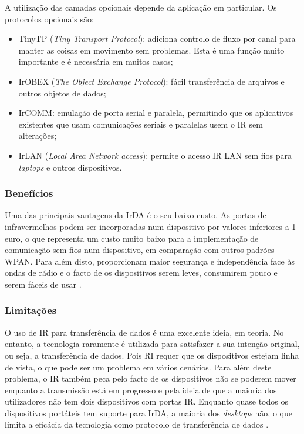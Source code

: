 \documentclass[conference]{IEEEtran}
\begin{document}
A utilização das camadas opcionais depende da aplicação em particular. Os protocolos opcionais são:

\begin{itemize}

 \item TinyTP (\textit{Tiny Transport Protocol}): adiciona controlo de fluxo por canal para manter as coisas em movimento sem problemas. Esta é uma função muito importante e é necessária em muitos casos;
 \item IrOBEX (\textit{The Object Exchange Protocol}): fácil transferência de arquivos e outros objetos de dados;
 \item IrCOMM: emulação de porta serial e paralela, permitindo que os aplicativos existentes que usam comunicações seriais e paralelas usem o IR sem alterações;
 \item IrLAN (\textit{Local Area Network access}): permite o acesso IR LAN sem fios para \textit{laptops} e outros dispositivos.

\end{itemize}



\subsubsection{Benefícios}

Uma das principais vantagens da IrDA é o seu baixo custo. 
As portas de infravermelhos podem ser incorporadas num dispositivo por valores inferiores a 1 euro, o que representa um custo muito baixo para a implementação de comunicação sem fios num dispositivo, em comparação com outros padrões WPAN. 
Para além disto, proporcionam maior segurança e independência face às ondas de rádio e o facto de os dispositivos serem leves, consumirem pouco e serem fáceis de usar \cite{infaredadvdis}.


\subsubsection{Limitações}

O uso de IR para transferência de dados é uma excelente ideia, em teoria. 
No entanto, a tecnologia raramente é utilizada para satisfazer a sua intenção original, ou seja, a transferência de dados. 
Pois RI requer que os dispositivos estejam linha de vista, o que pode ser um problema em vários cenários.
Para além deste problema, o IR também peca pelo facto de os dispositivos não se poderem mover enquanto a transmissão está em progresso e pela ideia de que a maioria dos utilizadores não tem dois dispositivos com portas IR. 
Enquanto quase todos os dispositivos portáteis tem suporte para IrDA, a maioria dos \textit{desktops} não, o que limita a eficácia da tecnologia como protocolo de transferência de dados \cite{wpanonline}.
\end{document}
